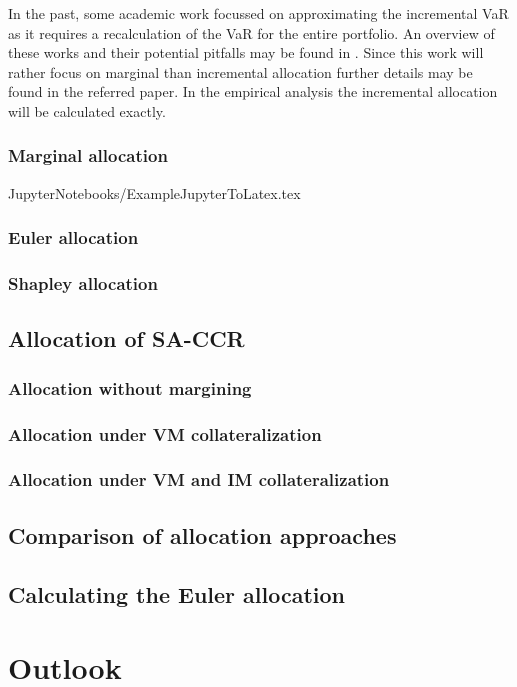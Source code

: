 \documentclass[12pt,a4paper]{article}
\begin{document}
In the past, some academic work focussed on approximating the incremental VaR as it requires a recalculation of the VaR for the entire portfolio. An overview of these works and their potential pitfalls may be found in \cite{tibiletti2001incremental}. Since this work will rather focus on marginal than incremental allocation further details may be found in the referred paper. In the empirical analysis the incremental allocation will be calculated exactly.

\subsubsection{Marginal allocation}

{JupyterNotebooks/ExampleJupyterToLatex.tex}

\subsubsection{Euler allocation}

\subsubsection{Shapley allocation}

\subsection{Allocation of SA-CCR}

\subsubsection{Allocation without margining}

\subsubsection{Allocation under VM collateralization}

\subsubsection{Allocation under VM and IM collateralization}

\subsection{Comparison of allocation approaches}

\subsection{Calculating the Euler allocation}

\section{Outlook}

\newpage
{} \nocite{*} %


\newpage
\begin{appendix}
\end{appendix}
\newpage \thispagestyle{empty}
\end{document}
